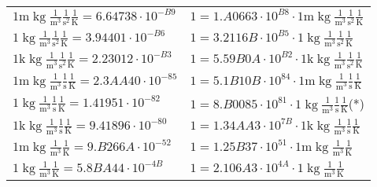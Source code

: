 \begin{center}
\begin{longtable}{l l}
\hline{\color{gray}$1 \bm{\mathrm{ m}}\operatorname{kg}\frac1{\operatorname{m}^3}\frac1{\operatorname{s}^2}{}\frac1{\operatorname{K}} = 6.64738\cdot10^{-B9} $}   & {\color{gray}$ 1 = 1.A0663\cdot10^{B8} \cdot 1 \bm{\mathrm{ m}}\operatorname{kg}\frac1{\operatorname{m}^3}\frac1{\operatorname{s}^2}{}\frac1{\operatorname{K}}$}  \\
{\color{black}$1 \bm{\mathrm{ }}\operatorname{kg}\frac1{\operatorname{m}^3}\frac1{\operatorname{s}^2}{}\frac1{\operatorname{K}} = 3.94401\cdot10^{-B6} $}   & {\color{black}$ 1 = 3.2116B\cdot10^{B5} \cdot 1 \bm{\mathrm{ }}\operatorname{kg}\frac1{\operatorname{m}^3}\frac1{\operatorname{s}^2}{}\frac1{\operatorname{K}}$}  \\
{\color{gray}$1 \bm{\mathrm{ k}}\operatorname{kg}\frac1{\operatorname{m}^3}\frac1{\operatorname{s}^2}{}\frac1{\operatorname{K}} = 2.23012\cdot10^{-B3} $}   & {\color{gray}$ 1 = 5.59B0A\cdot10^{B2} \cdot 1 \bm{\mathrm{ k}}\operatorname{kg}\frac1{\operatorname{m}^3}\frac1{\operatorname{s}^2}{}\frac1{\operatorname{K}}$}  \\
{\color{gray}$1 \bm{\mathrm{ m}}\operatorname{kg}\frac1{\operatorname{m}^3}\frac1{\operatorname{s}}{}\frac1{\operatorname{K}} = 2.3AA40\cdot10^{-85} $}   & {\color{gray}$ 1 = 5.1B10B\cdot10^{84} \cdot 1 \bm{\mathrm{ m}}\operatorname{kg}\frac1{\operatorname{m}^3}\frac1{\operatorname{s}}{}\frac1{\operatorname{K}}$}  \\
{\color{black}$1 \bm{\mathrm{ }}\operatorname{kg}\frac1{\operatorname{m}^3}\frac1{\operatorname{s}}{}\frac1{\operatorname{K}} = 1.41951\cdot10^{-82} $}   & {\color{black}$ 1 = 8.B0085\cdot10^{81} \cdot 1 \bm{\mathrm{ }}\operatorname{kg}\frac1{\operatorname{m}^3}\frac1{\operatorname{s}}{}\frac1{\operatorname{K}}$}\quad(*)\\
{\color{gray}$1 \bm{\mathrm{ k}}\operatorname{kg}\frac1{\operatorname{m}^3}\frac1{\operatorname{s}}{}\frac1{\operatorname{K}} = 9.41896\cdot10^{-80} $}   & {\color{gray}$ 1 = 1.34AA3\cdot10^{7B} \cdot 1 \bm{\mathrm{ k}}\operatorname{kg}\frac1{\operatorname{m}^3}\frac1{\operatorname{s}}{}\frac1{\operatorname{K}}$}  \\
{\color{gray}$1 \bm{\mathrm{ m}}\operatorname{kg}\frac1{\operatorname{m}^3}{}{}\frac1{\operatorname{K}} = 9.B266A\cdot10^{-52} $}   & {\color{gray}$ 1 = 1.25B37\cdot10^{51} \cdot 1 \bm{\mathrm{ m}}\operatorname{kg}\frac1{\operatorname{m}^3}{}{}\frac1{\operatorname{K}}$}  \\
{\color{black}$1 \bm{\mathrm{ }}\operatorname{kg}\frac1{\operatorname{m}^3}{}{}\frac1{\operatorname{K}} = 5.8BA44\cdot10^{-4B} $}   & {\color{black}$ 1 = 2.106A3\cdot10^{4A} \cdot 1 \bm{\mathrm{ }}\operatorname{kg}\frac1{\operatorname{m}^3}{}{}\frac1{\operatorname{K}}$}  \\

\end{longtable}
\end{center}
